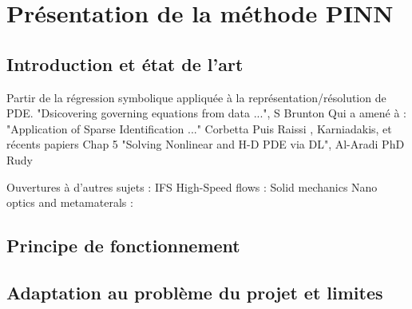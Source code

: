 \section{Présentation de la méthode PINN}

\subsection{Introduction et état de l'art}

Partir de la régression symbolique appliquée à la représentation/résolution de PDE.
"Dsicovering governing equations from data ...", S Brunton \cite{bruntonDiscoveringGoverningEquations2016}
Qui a amené à :
"Application of Sparse Identification ..." Corbetta \cite{corbettaApplicationSparseIdentification}
Puis Raissi \cite{raissiPhysicsinformedNeuralNetworks2019,raissiHiddenFluidMechanics2018}, Karniadakis, et récents papiers
Chap 5 "Solving Nonlinear and H-D PDE via DL", Al-Aradi \cite{al-aradiSolvingNonlinearHighDimensional}
PhD Rudy \cite{rudyComputationalMethodsSystem2019}


Ouvertures à d'autres sujets :
IFS \cite{raissiDeepLearningVortexinduced2019a}
High-Speed flows : \cite{maoPhysicsinformedNeuralNetworks2020}
Solid mechanics \cite{haghighatDeepLearningFramework2020,luExtractionMechanicalProperties2020}
Nano optics and metamaterals : \cite{chenPhysicsinformedNeuralNetworks2020}


\subsection{Principe de fonctionnement}

\subsection{Adaptation au problème du projet et limites}


